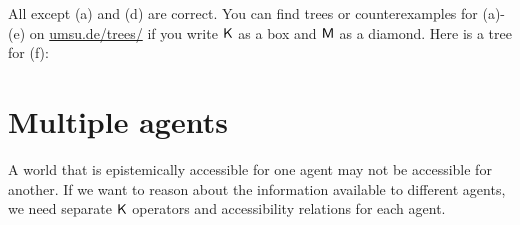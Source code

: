 \begin{solution}
  All except (a) and (d) are correct. You can find trees or counterexamples for (a)-(e) on
  \href{https://www.umsu.de/trees/}{umsu.de/trees/} if
  you write $\operatorname{\mathsf{K}{}}$ as a box and $\operatorname{\mathsf{M}}$ as a diamond. Here is a tree for (f):
  \begin{center}
  \end{center}
\end{solution}


\section{Multiple agents}
\label{sec:multi}

A world that is epistemically accessible for one agent may not be accessible for
another. If we want to reason about the information available to different
agents, we need separate $\operatorname{\mathsf{K}{}}$ operators and accessibility relations for each
agent.

